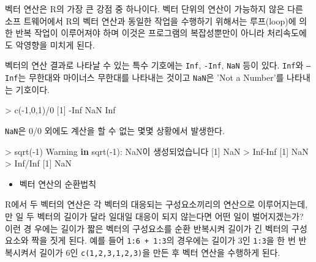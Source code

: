 \documentclass[
]{book}
\newenvironment{Shaded}{\begin{snugshade}}{\end{snugshade}}
\newcommand{\ConstantTok}[1]{\textcolor[rgb]{0.00,0.00,0.00}{#1}}
\newcommand{\ControlFlowTok}[1]{\textcolor[rgb]{0.13,0.29,0.53}{\textbf{#1}}}
\newcommand{\DecValTok}[1]{\textcolor[rgb]{0.00,0.00,0.81}{#1}}
\newcommand{\FunctionTok}[1]{\textcolor[rgb]{0.00,0.00,0.00}{#1}}
\newcommand{\NormalTok}[1]{#1}
\newcommand{\SpecialCharTok}[1]{\textcolor[rgb]{0.00,0.00,0.00}{#1}}
\providecommand{\tightlist}{%
  \setlength{\itemsep}{0pt}\setlength{\parskip}{0pt}}
\begin{document}
벡터 연산은 R의 가장 큰 강점 중 하나이다. 벡터 단위의 연산이 가능하지 않은 다른 소프
트웨어에서 R의 벡터 연산과 동일한 작업을 수행하기 위해서는 루프(loop)에 의한 반복
작업이 이루어져야 하며 이것은 프로그램의 복잡성뿐만이 아니라 처리속도에도 악영향을
미치게 된다.

벡터의 연산 결과로 나타날 수 있는 특수 기호에는 \texttt{Inf}, \texttt{-Inf}, \texttt{NaN} 등이 있다.
\texttt{Inf}와 \texttt{–Inf}는 무한대와 마이너스 무한대를 나타내는 것이고 \texttt{NaN}은 'Not a Number'를 나타내는 기호이다.

\begin{Shaded}
\begin{Highlighting}[]
\SpecialCharTok{\textgreater{}} \FunctionTok{c}\NormalTok{(}\SpecialCharTok{{-}}\DecValTok{1}\NormalTok{,}\DecValTok{0}\NormalTok{,}\DecValTok{1}\NormalTok{)}\SpecialCharTok{/}\DecValTok{0}
\NormalTok{[}\DecValTok{1}\NormalTok{] }\SpecialCharTok{{-}}\ConstantTok{Inf}  \ConstantTok{NaN}  \ConstantTok{Inf}
\end{Highlighting}
\end{Shaded}

\texttt{NaN}은 0/0 외에도 계산을 할 수 없는 몇몇 상황에서 발생한다.

\begin{Shaded}
\begin{Highlighting}[]
\SpecialCharTok{\textgreater{}} \FunctionTok{sqrt}\NormalTok{(}\SpecialCharTok{{-}}\DecValTok{1}\NormalTok{)}
\NormalTok{Warning }\ControlFlowTok{in} \FunctionTok{sqrt}\NormalTok{(}\SpecialCharTok{{-}}\DecValTok{1}\NormalTok{)}\SpecialCharTok{:}\NormalTok{ NaN이 생성되었습니다}
\NormalTok{[}\DecValTok{1}\NormalTok{] }\ConstantTok{NaN}
\SpecialCharTok{\textgreater{}} \ConstantTok{Inf}\SpecialCharTok{{-}}\ConstantTok{Inf}
\NormalTok{[}\DecValTok{1}\NormalTok{] }\ConstantTok{NaN}
\SpecialCharTok{\textgreater{}} \ConstantTok{Inf}\SpecialCharTok{/}\ConstantTok{Inf}
\NormalTok{[}\DecValTok{1}\NormalTok{] }\ConstantTok{NaN}
\end{Highlighting}
\end{Shaded}

\begin{itemize}
\tightlist
\item
  벡터 연산의 순환법칙
\end{itemize}

R에서 두 벡터의 연산은 각 벡터의 대응되는 구성요소끼리의 연산으로 이루어지는데, 만
일 두 벡터의 길이가 달라 일대일 대응이 되지 않는다면 어떤 일이 벌어지겠는가? 이런 경
우에는 길이가 짧은 벡터의 구성요소를 순환 반복시켜 길이가 긴 벡터의 구성요소와 짝을
짓게 된다. 예를 들어 \texttt{1:6\ +\ 1:3}의 경우에는 길이가 3인 \texttt{1:3}을 한 번 반복시켜서 길이가
6인 \texttt{c(1,2,3,1,2,3)}을 만든 후 벡터 연산을 수행하게 된다.
\end{document}
